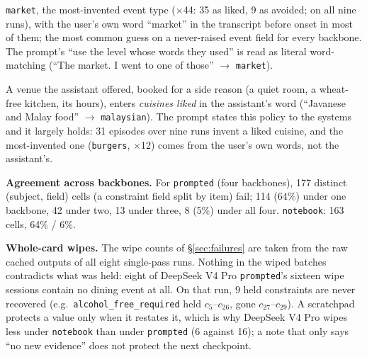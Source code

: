 \documentclass{article}
\begin{document}
\begin{description}
  \texttt{market}, the most-invented event type ($\times$44: 35 as liked, 9 as avoided; on all nine runs), with the user's own
  word ``market'' in the transcript before onset in most of them; the most common guess on a
  never-raised event field for every backbone. The prompt's ``use the level whose words they used''
  is read as literal word-matching (``The market. I went to one of those'' $\to$ \texttt{market}).
  \item[Booking $\neq$ liking / assistant label copied.] A venue the assistant offered, booked for a
  side reason (a quiet room, a wheat-free kitchen, its hours), enters \emph{cuisines liked} in the
  assistant's word (``Javanese and Malay food'' $\to$ \texttt{malaysian}). The prompt states this
  policy to the systems and it largely holds: 31 episodes over nine runs invent a liked cuisine, and
  the most-invented one (\texttt{burgers}, $\times$12) comes from the user's own words, not the
  assistant's.
\end{description}

\textbf{Agreement across backbones.} For \texttt{prompted} (four backbones), 177
distinct (subject, field) cells (a constraint field split by item) fail; 114 (64\%) under one backbone, 42 under two, 13 under three,
8 (5\%) under all four. \texttt{notebook}: 163 cells, 64\% / 6\%.

\textbf{Whole-card wipes.} The wipe counts of \S\ref{sec:failures} are taken from the raw cached
outputs of all eight single-pass runs. Nothing in the wiped batches contradicts what was held:
eight of DeepSeek V4 Pro \texttt{prompted}'s sixteen wipe sessions contain no dining event at all.
On that run, 9 held constraints are never recovered (e.g.\ \texttt{alcohol\_free\_required} held $c_5$--$c_{26}$,
gone $c_{27}$--$c_{29}$). A scratchpad protects a value only when it restates it, which is why
DeepSeek V4 Pro wipes less under \texttt{notebook} than under \texttt{prompted} (6 against 16); a
note that only says ``no new evidence'' does not protect the next checkpoint.
\end{document}
